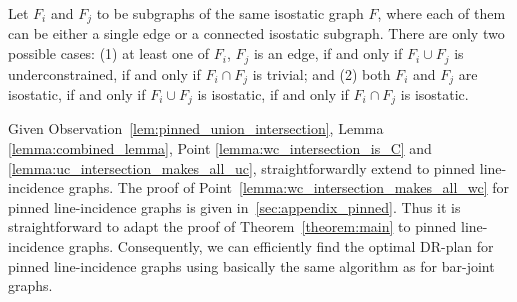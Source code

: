 \begin{observation}\label{lem:pinned_union_intersection}
    Let $F_i$ and $F_j$ to be subgraphs of the same isostatic graph $F$, where each of them can be either a single edge or a connected isostatic subgraph. There are only two possible cases:
    (1) at least one of $F_i$, $F_j$ is an edge, if and only if $F_i \cup F_j$ is underconstrained, if and only if $F_i \cap F_j$ is trivial; and (2) both $F_i$ and $F_j$ are isostatic, if and only if $F_i \cup F_j$ is isostatic, if and only if $F_i \cap F_j$ is isostatic.
\end{observation}

Given Observation~\ref{lem:pinned_union_intersection}, %
Lemma \ref{lemma:combined_lemma}, Point \ref{lemma:wc_intersection_is_C} and \ref{lemma:uc_intersection_makes_all_uc}, straightforwardly extend to pinned line-incidence graphs. The proof of Point~\ref{lemma:wc_intersection_makes_all_wc} for pinned line-incidence graphs is given in~\ref{sec:appendix_pinned}.
Thus it is straightforward to adapt the proof of Theorem~\ref{theorem:main} to  pinned line-incidence graphs.
%
Consequently, we can efficiently find the optimal DR-plan for  pinned line-incidence graphs using basically the same algorithm as for  bar-joint graphs.

